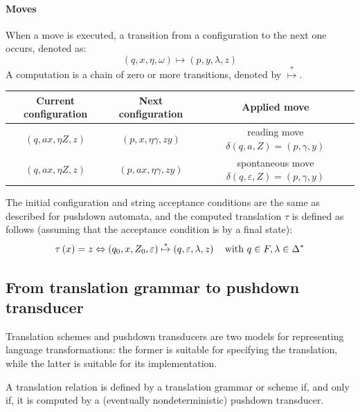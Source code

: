 \paragraph*{Moves}
When a move is executed, a transition from a configuration to the next one occurs, denoted as: 
\[ \left( q, x, \eta, \omega \right) \mapsto \left( p, y, \lambda, z \right)\]
A computation is a chain of zero or more transitions, denoted by $\overset{\ast}{\mapsto}$.
\begin{table}[H]
    \centering
    \begin{tabular}{c|c|c}
        \textbf{Current configuration}      & \textbf{Next configuration}               & \textbf{Applied move}                                                                           \\ \hline                                                                                                                                                                        
        $\left( q, ax, \eta Z, z \right)$   & $\left( p, x, \eta \gamma, z y \right)$   & reading move $\delta\left( q, a, Z \right) = \left( p, \gamma, y \right)$                       \\
        $\left( q, ax, \eta Z, z \right)$   & $\left( p, ax, \eta\gamma, zy \right)$    & spontaneous move $\delta\left( q, \varepsilon, Z \right) = \left( p, \gamma, y \right)$
    \end{tabular}
\end{table}
The initial configuration and string acceptance conditions are the same as described for pushdown automata, and the computed translation $\tau$ is defined as follows (assuming that the acceptance condition is by a final state):
\[ \tau\left( x \right) = z \Leftrightarrow \left( q_0, x, Z_0, \varepsilon \right) \overset{\ast}{\mapsto} \left( q, \varepsilon, \lambda, z \right) \quad \textnormal{with } q \in F, \lambda \in \Delta^{\ast} \]

\subsection{From translation grammar to pushdown transducer}
Translation schemes and pushdown transducers are two models for representing language transformations: the former is suitable for specifying the translation, while the latter is suitable for its implementation.
\begin{property}
    A translation relation is defined by a translation grammar or scheme if, and only if, it is computed by a (eventually nondeterministic) pushdown transducer.
\end{property}

